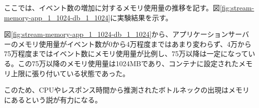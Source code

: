\documentclass[../../../../../main]{subfiles}
\begin{document}
    \label{subsubsec:result-chunk-only-limit-memory}

    ここでは、イベント数の増加に対するメモリ使用量の推移を記す。図\ref{fig:stream-memory-app_1_1024-db_1_1024}に実験結果を示す。

    

    図\ref{fig:stream-memory-app_1_1024-db_1_1024}から、アプリケーションサーバーのメモリ使用量がイベント数が0から4万程度まではあまり変わらず、4万から75万程度まではイベント数にメモリ使用量が比例し、75万以降は一定になっている。この75万以降のメモリ使用量は1024MBであり、コンテナに設定されたメモリ上限に張り付いている状態であった。

    このため、CPUやレスポンス時間から推測されたボトルネックの出現はメモリにあるという説が有力になる。
\end{document}
